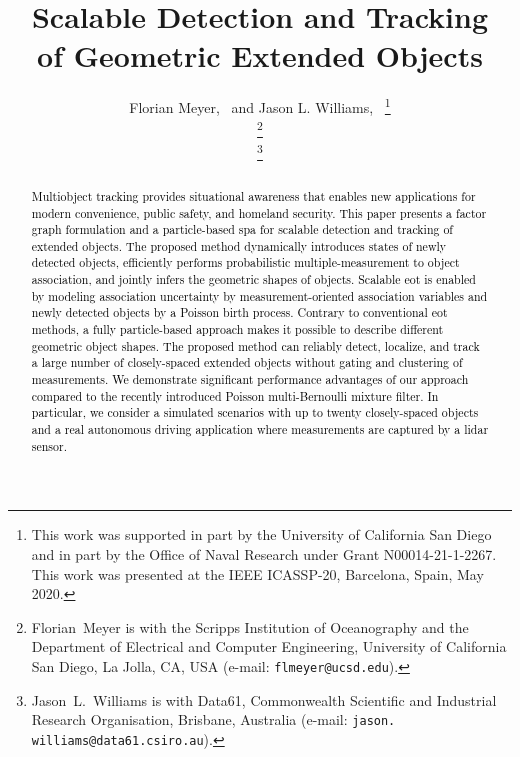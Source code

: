 \documentclass[10pt, twoside, romanappendices]{IEEEtran}
\providecommand{\rd}{\textcolor{black}}
\newcommand{\paperTitle}{Scalable Detection and Tracking\\ of Geometric Extended Objects}
\begin{document}
\title{\paperTitle \vspace*{0mm}}

\author{\normalsize Florian Meyer,~ and Jason L. Williams,~  \thanks{
%

This work was supported in part by the University of California San Diego and in part by the Office of Naval Research under Grant N00014-21-1-2267. This work was presented at the IEEE ICASSP-20, Barcelona, Spain, May 2020.}

\thanks{Florian~Meyer is with the Scripps Institution of Oceanography and the Department of Electrical and Computer Engineering, University of California San Diego, La Jolla, CA, USA (e-mail: \texttt{flmeyer@ucsd.edu}).}

\thanks{Jason~L.~Williams is with Data61, Commonwealth Scientific and Industrial Research Organisation, Brisbane, Australia (e-mail: \texttt{jason.} \texttt{williams@data61.csiro.au}).}





\vspace*{-1mm}
}

\maketitle



\begin{abstract}
\rd{Multiobject tracking provides situational awareness that enables new applications for modern convenience, public safety, and homeland security. This paper presents a factor graph formulation and a particle-based \ac{spa} for scalable detection and tracking of extended objects. The proposed method dynamically introduces states of newly detected objects, efficiently performs probabilistic multiple-measurement to object association, and jointly infers the geometric shapes of objects. Scalable \ac{eot} is enabled by modeling association uncertainty by measurement-oriented association variables and newly detected objects by a Poisson birth process. Contrary to conventional \ac{eot} methods, a fully particle-based approach makes it possible to describe different geometric object shapes. The proposed method can reliably detect, localize, and track a large number of closely-spaced extended objects without gating and clustering of measurements. We demonstrate significant performance advantages of our approach compared to the recently introduced Poisson multi-Bernoulli mixture filter. In particular, we consider a simulated scenarios with up to twenty closely-spaced objects and a real autonomous driving application where measurements are captured by a lidar sensor.}
\end{abstract}
\end{document}
